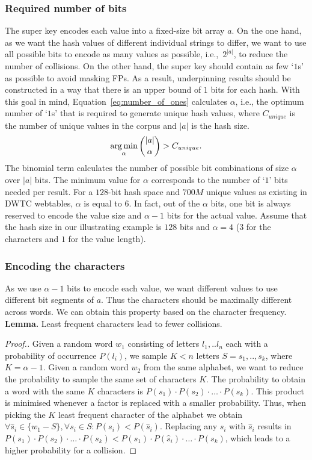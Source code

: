 \subsubsection{Required number of bits}
The super key encodes each value into a fixed-size bit array $a$. 
On the one hand, as we want the hash values of different individual strings to differ, we want to use all possible bits to encode as many values as possible, i.e.,~$2^{|a|}$, to reduce the number of collisions.
On the other hand, the super key should contain as few `$1$s' as possible to avoid masking FPs.
As a result, underpinning \hash results should be constructed in a way that there is an upper bound of $1$ bits for each hash.
With this goal in mind, Equation~\ref{eq:number_of_ones} calculates $\alpha$, i.e., the optimum number of `$1$s' that is required to generate unique hash values, where $C_{unique}$ is the number of unique values in the corpus and $|a|$ is the hash size.
\begin{equation}\label{eq:number_of_ones}
\small
    \operatorname*{arg\,min}_{\alpha} {|a| \choose \alpha} > C_{unique}.
\end{equation}
The binomial term calculates the number of possible bit combinations of size $\alpha$ over $|a|$ bits.
The minimum value for $\alpha$
corresponds to the number of `$1$' bits needed per \hash result.
For a $128$-bit hash space and $700M$ unique values as existing in DWTC webtables, $\alpha$ is equal to $6$. 
In fact, out of the $\alpha$ bits, one bit is always reserved to encode the value size and $\alpha-1$ bits for the actual value.
Assume that the hash size in our illustrating example is $128$ bits and $\alpha = 4$ ($3$ for the characters and $1$ for the value length).

\subsubsection{Encoding the characters}\label{subsubsec:encoding_chars}
As we use $\alpha-1$ bits to encode each value, we want different values to use different bit segments of $a$.
Thus the characters should be maximally different across words. We can obtain this property based on the character frequency.
\textbf{Lemma.} Least frequent characters lead to fewer collisions.
\begin{proof}[Proof.]
Given a random word $w_1$ consisting of letters ${l_1,..l_n}$ each with a probability of occurrence $P(l_i)$, we sample $K<n$
letters $S= {s_1,..,s_k}$, where $K=\alpha - 1$. 
Given a random word $w_2$ from the same alphabet, we want to reduce the probability to sample the same set of characters $K$.
The probability to obtain a word with the same $K$ characters is $P(s_1)\cdot P(s_2)\cdot\dots\cdot P(s_k)$. 
This product is minimised whenever a factor is replaced with a smaller probability. Thus, when picking the $K$ least frequent character of the alphabet we obtain $\forall \hat{s}_i \in \{w_1 - S\}, \forall s_i\in S: P(s_i) < P(\hat{s}_i)$. 
Replacing any $s_i$ with $\hat{s}_i$ results in $P(s_1)\cdot P(s_2)\cdot\dots\cdot P(s_k) < P(s_1)\cdot P(\hat{s}_i)\cdot\dots\cdot P(s_k)$, which leads to a higher probability for a collision.
\end{proof}


